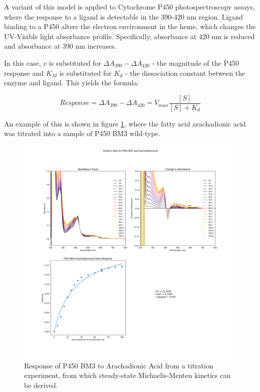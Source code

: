 \documentclass{article}
\begin{document}
A variant of this model is applied to Cytochrome P450 photospectroscopy assays, where the response to a ligand is detectable in the 390-420 nm region.
Ligand binding to a P450 alters the electron environment in the heme, which changes the UV-Visible light absorbance profile.
Specifically, absorbance at 420 nm is reduced and absorbance at 390 nm increases.

In this case, $v$ is substituted for $\Delta A_{390} - \Delta A_{420}$ - the magnitude of the P450 response and $K_M$ is substituted for $K_d$ - the dissociation constant between the enzyme and ligand.
This yields the formula:

$$ Response = \Delta A_{390} - \Delta A_{420} = V_{max} \frac{[S]}{[S] + K_d} $$

An example of this is shown in figure \ref{arachadionictitration}, where the fatty acid arachadionic acid was titrated into a sample of P450 BM3 wild-type.

\begin{figure}\label{arachadionictitration}
	\caption{Response of P450 BM3 to Arachadionic Acid from a titration experiment, from which steady-state Michaelis-Menten kinetics can be derived.}
	\includegraphics[width = \textwidth]{img/ArachadionicAcid.png}
\end{figure}

\end{document}
